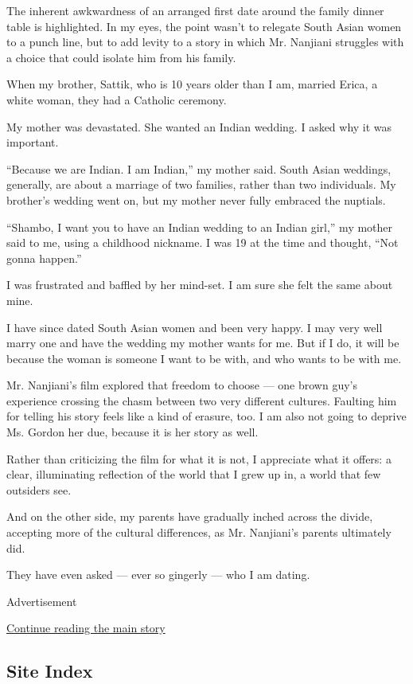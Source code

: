 The inherent awkwardness of an arranged first date around the family
dinner table is highlighted. In my eyes, the point wasn't to relegate
South Asian women to a punch line, but to add levity to a story in which
Mr. Nanjiani struggles with a choice that could isolate him from his
family.

When my brother, Sattik, who is 10 years older than I am, married Erica,
a white woman, they had a Catholic ceremony.

My mother was devastated. She wanted an Indian wedding. I asked why it
was important.

``Because we are Indian. I am Indian,'' my mother said. South Asian
weddings, generally, are about a marriage of two families, rather than
two individuals. My brother's wedding went on, but my mother never fully
embraced the nuptials.

``Shambo, I want you to have an Indian wedding to an Indian girl,'' my
mother said to me, using a childhood nickname. I was 19 at the time and
thought, ``Not gonna happen.''

I was frustrated and baffled by her mind-set. I am sure she felt the
same about mine.

I have since dated South Asian women and been very happy. I may very
well marry one and have the wedding my mother wants for me. But if I do,
it will be because the woman is someone I want to be with, and who wants
to be with me.

Mr. Nanjiani's film explored that freedom to choose --- one brown guy's
experience crossing the chasm between two very different cultures.
Faulting him for telling his story feels like a kind of erasure, too. I
am also not going to deprive Ms. Gordon her due, because it is her story
as well.

Rather than criticizing the film for what it is not, I appreciate what
it offers: a clear, illuminating reflection of the world that I grew up
in, a world that few outsiders see.

And on the other side, my parents have gradually inched across the
divide, accepting more of the cultural differences, as Mr. Nanjiani's
parents ultimately did.

They have even asked --- ever so gingerly --- who I am dating.

Advertisement

\protect\hyperlink{after-bottom}{Continue reading the main story}

\hypertarget{site-index}{%
\subsection{Site Index}\label{site-index}}

